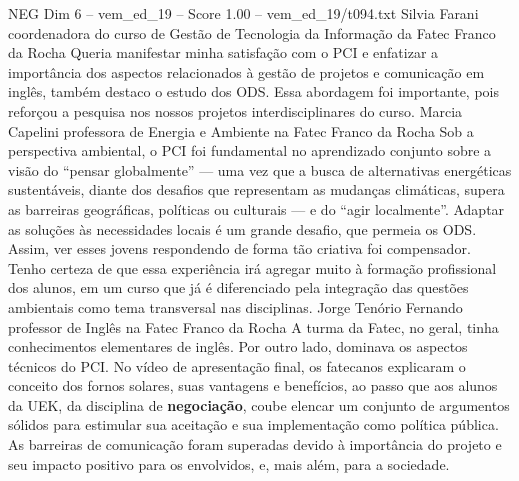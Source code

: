 \begin{textsample}{NEG Dim 6 – vem\_ed\_19 – Score 1.00 – vem\_ed\_19/t094.txt}  \label{ex:f6_neg_049}
Silvia Farani coordenadora do curso de Gestão de Tecnologia da Informação da Fatec Franco da Rocha Queria manifestar minha satisfação com o PCI e enfatizar a importância dos aspectos relacionados à gestão de projetos e comunicação em inglês, também destaco o estudo dos ODS.
Essa abordagem foi importante, pois reforçou a pesquisa nos nossos projetos interdisciplinares do curso.
Marcia Capelini professora de Energia e Ambiente na Fatec Franco da Rocha Sob a perspectiva ambiental, o PCI foi fundamental no aprendizado conjunto sobre a visão do “pensar globalmente” — uma vez que a busca de alternativas energéticas sustentáveis, diante dos desafios que representam as mudanças climáticas, supera as barreiras geográficas, políticas ou culturais — e do “agir localmente”.
Adaptar as soluções às necessidades locais é um grande desafio, que permeia os ODS.
Assim, ver esses jovens respondendo de forma tão criativa foi compensador.
Tenho certeza de que essa experiência irá agregar muito à formação profissional dos alunos, em um curso que já é diferenciado pela integração das questões ambientais como tema transversal nas disciplinas.
Jorge Tenório Fernando professor de Inglês na Fatec Franco da Rocha A turma da Fatec, no geral, tinha conhecimentos elementares de inglês.
Por outro lado, dominava os aspectos técnicos do PCI.
No vídeo de apresentação final, os fatecanos explicaram o conceito dos fornos solares, suas vantagens e benefícios, ao passo que aos alunos da UEK, da disciplina de \textbf{negociação}, coube elencar um conjunto de argumentos sólidos para estimular sua aceitação e sua implementação como política pública.
As barreiras de comunicação foram superadas devido à importância do projeto e seu impacto positivo para os envolvidos, e, mais além, para a sociedade.

\end{textsample}
